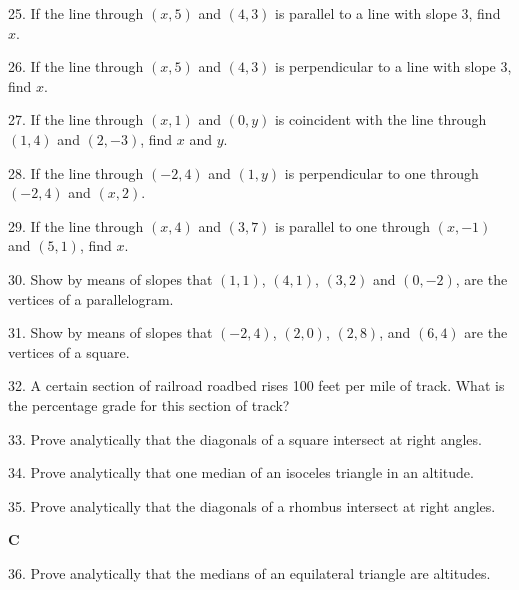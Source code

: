 \documentclass[10pt,letterpaper]{article}
\begin{document}
25. If the line through $(x,5)$ and $(4,3)$ is parallel to a line with slope 3, find $x$.

26. If the line through $(x,5)$ and $(4,3)$ is perpendicular to a line with slope 3, find $x$.

27. If the line through $(x,1)$ and $(0,y)$ is coincident with the line through $(1,4)$ and $(2,-3)$, find $x$ and $y$.

28. If the line through $(-2,4)$ and $(1,y)$ is perpendicular to one through $(-2,4)$ and $(x,2)$.

29. If the line through $(x,4)$ and $(3,7)$ is parallel to one through $(x,-1)$ and $(5,1)$, find $x$.

30. Show by means of slopes that $(1,1)$, $(4,1)$, $(3,2)$ and $(0,-2)$, are the vertices of a parallelogram.

31. Show by means of slopes that $(-2,4)$, $(2,0)$, $(2,8)$, and $(6,4)$ are the vertices of a square.

32. A certain section of railroad roadbed rises 100 feet per mile of track. What is the percentage grade for this section of track?

33. Prove analytically that the diagonals of a square intersect at right angles.

34. Prove analytically that one median of an isoceles triangle in an altitude.

35. Prove analytically that the diagonals of a rhombus intersect at right angles.

\medskip
\textbf{C}
\medskip

36. Prove analytically that the medians of an equilateral triangle are altitudes.
\end{document}
